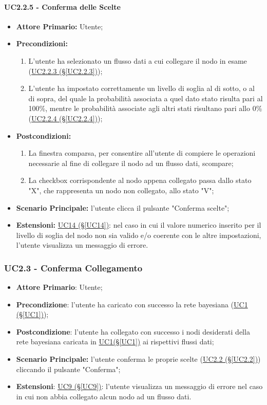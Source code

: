 \paragraph{UC2.2.5 - Conferma delle Scelte}\label{UC2.2.5}
\begin{itemize}
\item \textbf{Attore Primario:} Utente;
\item \textbf{Precondizioni:}
	\begin{enumerate}
	\item L'utente ha selezionato un flusso dati a cui collegare il nodo in esame (\hyperref[UC2.2.3]{UC2.2.3 							(§\ref*{UC2.2.3})});
	\item L'utente ha impostato correttamente un livello di soglia al di sotto, o al di sopra, 	del quale la probabilità associata a quel dato stato risulta pari al 100\%, mentre le probabilità associate agli altri stati risultano pari allo 0\% (\hyperref[UC2.2.4]{UC2.2.4 (§\ref*{UC2.2.4})});
	\end{enumerate}
\item \textbf{Postcondizioni:}
	\begin{enumerate}
	\item La finestra comparsa, per consentire all'utente di compiere le operazioni necessarie al fine di collegare il 		nodo ad un flusso dati, scompare;
	\item La checkbox corrispondente al nodo appena collegato passa dallo stato "X", che rappresenta un nodo non 					collegato, allo stato "V";
	\end{enumerate}
\item \textbf{Scenario Principale:} l'utente clicca il pulsante "Conferma scelte";
\item \textbf{Estensioni:} \hyperref[UC14]{UC14 (§\ref*{UC14})}: nel caso in cui il valore numerico inserito per il livello di soglia del nodo non sia valido e/o coerente con le altre impostazioni, l'utente visualizza un messaggio di errore.
\end{itemize}

\pagebreak

\subsubsection{UC2.3 - Conferma Collegamento}\label{UC2.3}
\begin{itemize}
\item \textbf{Attore Primario}: Utente;
\item \textbf{Precondizione}: l'utente ha caricato con successo la rete bayesiana (\hyperref[UC1]{UC1 (§\ref*{UC1})});
\item \textbf{Postcondizione}: l'utente ha collegato con successo i nodi desiderati della rete bayesiana caricata 			in \hyperref[UC1]{UC1(§\ref*{UC1})} ai rispettivi flussi dati;
\item \textbf{Scenario Principale:} l'utente conferma le proprie scelte (\hyperref[UC2.2]{UC2.2 (§\ref*{UC2.2})}) cliccando il pulsante "Conferma";
\item \textbf{Estensioni}: \hyperref[UC9]{UC9 (§\ref*{UC9})}: l'utente visualizza un messaggio di errore nel caso in cui non abbia collegato alcun nodo ad un flusso dati.
\end{itemize}
\newpage

